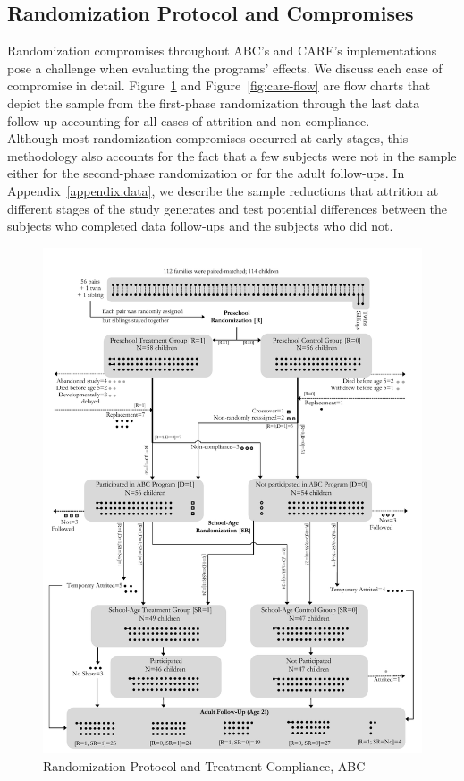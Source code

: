 \subsection{Randomization Protocol and Compromises} \label{appendix:randomization}

\noindent Randomization compromises throughout ABC's and CARE's implementations pose a challenge when evaluating the programs' effects. We discuss each case of compromise in detail. Figure~\ref{fig:abc-flow} and Figure~\ref{fig:care-flow} are flow charts that depict the sample from the first-phase randomization through the last data follow-up accounting for all cases of attrition and non-compliance.\\

\noindent Although most randomization compromises occurred at early stages, this methodology also accounts for the fact that a few subjects were not in the sample either for the second-phase randomization or for the adult follow-ups. In Appendix~\ref{appendix:data}, we describe the sample reductions that attrition at different stages of the study generates and test potential differences between the subjects who completed data follow-ups and the subjects who did not.\\

	\begin{figure}[H]
		\caption{Randomization Protocol and Treatment Compliance, ABC} \label{fig:abc-flow}
		\centering
		\includegraphics[width=.92\columnwidth]{output/abc_Diagram.pdf}
	\end{figure}
	
